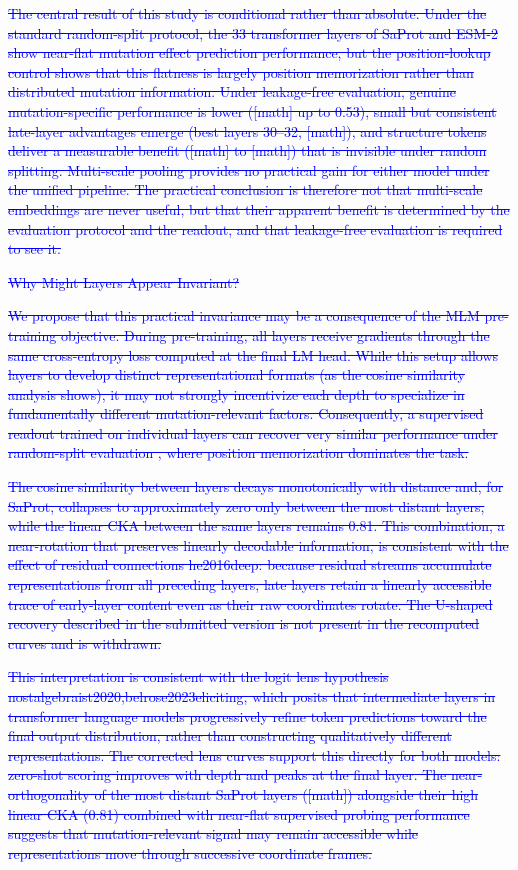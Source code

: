 \documentclass[11pt,a4paper]{article}
\begin{document}
\textcolor{blue}{\sout{The central result of this study is conditional rather than absolute. Under
the standard random-split protocol, the 33 transformer layers of SaProt and ESM-2 show
near-flat mutation effect prediction performance, but the position-lookup control shows
that this flatness is largely position memorization rather than distributed mutation
information. Under leakage-free evaluation, genuine mutation-specific performance is
lower ([math] up to 0.53), small but consistent late-layer advantages emerge (best
layers 30--32, [math]), and structure tokens deliver a measurable
benefit ([math] to [math]) that is invisible under random splitting. Multi-scale
pooling provides no practical gain for either model under the unified pipeline. The
practical conclusion is therefore not that multi-scale embeddings are never useful,
but that their apparent benefit is determined by the evaluation protocol and the
readout, and that leakage-free evaluation is required to see it.}}

\textcolor{blue}{\sout{Why Might Layers Appear Invariant?}}

\textcolor{blue}{\sout{We propose that this practical invariance may be a consequence of the MLM pre-training
objective. During pre-training, all layers receive gradients through the same
cross-entropy loss computed at the final LM head. While this setup allows layers
to develop distinct representational formats (as the cosine similarity analysis
shows), it may not strongly incentivize each depth to specialize in fundamentally
different mutation-relevant factors. Consequently, a supervised readout trained on
individual layers can recover very similar performance under random-split evaluation
, where position memorization dominates the task.}}

\textcolor{blue}{\sout{The cosine similarity between layers decays monotonically with distance and,
for SaProt, collapses to approximately zero only between the most distant layers,
while the linear CKA between the same layers remains 0.81. This combination, a
near-rotation that preserves linearly decodable information, is consistent with the
effect of residual connections he2016deep: because residual streams accumulate
representations from all preceding layers, late layers retain a linearly accessible
trace of early-layer content even as their raw coordinates rotate. The U-shaped
recovery described in the submitted version is not present in the recomputed curves
and is withdrawn.}}

\textcolor{blue}{\sout{This interpretation is consistent with the logit lens
hypothesis nostalgebraist2020,belrose2023eliciting,
which posits that intermediate layers in transformer language models progressively
refine token predictions toward the final output distribution, rather than
constructing qualitatively different representations. The corrected lens
curves support this directly for both models: zero-shot scoring improves with depth
and peaks at the final layer. The near-orthogonality of the most distant SaProt
layers ([math]) alongside their high linear CKA (0.81)
combined with near-flat supervised probing
performance suggests that mutation-relevant signal may remain accessible while
representations move through successive coordinate frames.}}
\end{document}
